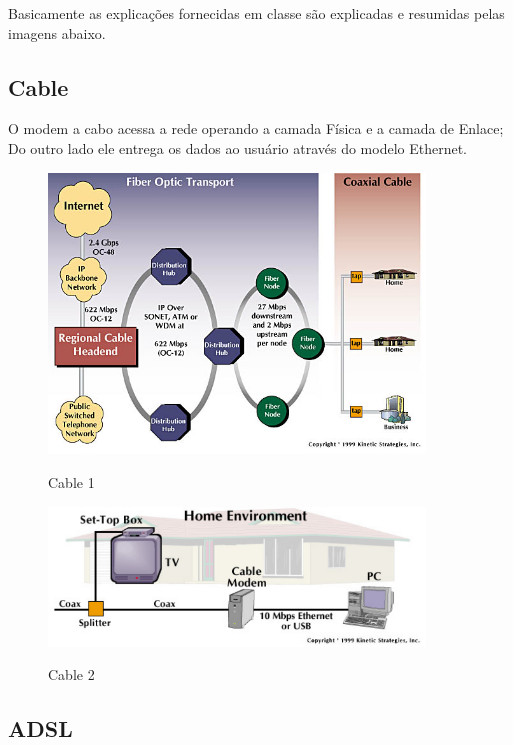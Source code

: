 \documentclass{article}
\begin{document}
Basicamente as explicações fornecidas em classe são explicadas e resumidas pelas
imagens abaixo.

\subsection{Cable}

O modem a cabo acessa a rede operando a camada Física e a camada de Enlace; Do
outro lado ele entrega os dados ao usuário através do modelo Ethernet.
\begin{figure}[h]
    \center
    \includegraphics[width=10cm]{imagens/cable.png}
    \label{cable}
    \caption{Cable 1}
\end{figure}
\begin{figure}[h]
    \center
    \includegraphics[width=10cm]{imagens/cable2.png}
    \label{cable2}
    \caption{Cable 2}
\end{figure}


\subsection{ADSL}
\end{document}
